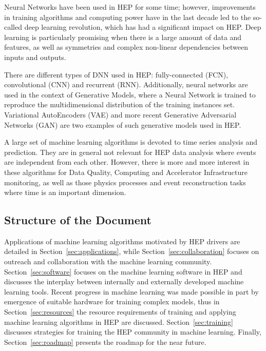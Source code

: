Neural Networks have been used in HEP for some time; however, improvements in training algorithms and computing power have in the last decade led to the so-called deep learning
revolution, which has had a significant impact on HEP. Deep learning is particularly promising when there is a large amount of data and features, as well as symmetries and complex non-linear dependencies between inputs and outputs.

There are different types of DNN used in HEP: fully-connected (FCN), convolutional (CNN) and recurrent (RNN). Additionally, neural networks are used in the context of Generative Models, where a Neural Network is trained to reproduce the multidimensional distribution of the training instances set. Variational AutoEncoders (VAE) and more recent Generative Adversarial Networks (GAN) are two examples of such generative models used in HEP.

A large set of machine learning algorithms is devoted to time series analysis and prediction. They are in general not relevant for HEP data analysis where events are independent from each other. However, there is more and more interest in these algorithms for Data Quality, Computing and Accelerator Infrastructure monitoring, as well as those physics processes and event reconstruction tasks where time is an important dimension.


\subsection{Structure of the Document}


Applications of machine learning algorithms motivated by HEP drivers are detailed in Section~\ref{sec:applications}, while Section~\ref{sec:collaboration} focuses on outreach and collaboration with the machine learning community. Section~\ref{sec:software} focuses on the machine learning software in HEP and discusses the interplay between internally and externally developed machine learning tools. Recent progress in machine learning was made possible in part by emergence of suitable hardware for training complex models, thus in Section~\ref{sec:resources} the resource requirements of training and applying machine learning algorithms in HEP are discussed. Section~\ref{sec:training} discusses strategies for training the HEP community in machine learning.  Finally, Section~\ref{sec:roadmap} presents the roadmap for the near future.

